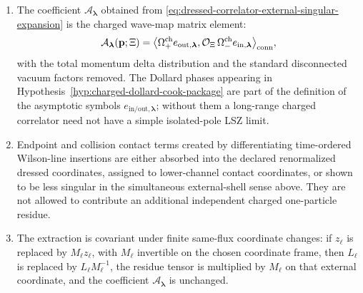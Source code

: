 \begin{hypothesis}
\begin{enumerate}
\begin{equation}
  \widehat G_{\mathbf a}(\mathbf p;\Xi)
  =
  \frac{\ii^{N}
    \sum_{\boldsymbol\lambda}
      \prod_{\ell=1}^{N}
        z_{\ell,a_\ell}{}^{\lambda_\ell}(p_\ell)\,
      \mathcal A_{\boldsymbol\lambda}(\mathbf p;\Xi)}
       {\prod_{\ell=1}^{N}(p_\ell^2+m_\ell^2-\ii0)}
  +
  \widehat G_{\mathbf a}^{\rm less}(\mathbf p;\Xi).
  \label{eq:dressed-correlator-external-singular-expansion}
\end{equation}
Here \(\Xi\) denotes compact gauge-invariant insertions or the remaining
external variables, and ``less'' means that after multiplying by
\(\prod_{\ell}(p_\ell^2+m_\ell^2-\ii0)\) and applying the left inverses, the
term has zero simultaneous shell limit in the wave-packet topology being
used.  Partial shell singularities are assigned to the corresponding
lower-particle disconnected or lower-channel matrix elements before the
connected amplitude is read off.
\item The coefficient
\(\mathcal A_{\boldsymbol\lambda}\) obtained from
\eqref{eq:dressed-correlator-external-singular-expansion} is the charged
wave-map matrix element:
\begin{equation}
  \mathcal A_{\boldsymbol\lambda}(\mathbf p;\Xi)
  =
  \bigl\langle
    \Omega_{+}^{\mathrm{ch}}e_{\mathrm{out},\boldsymbol\lambda},
    \mathcal O_\Xi\,
    \Omega_{-}^{\mathrm{ch}}e_{\mathrm{in},\boldsymbol\lambda}
  \bigr\rangle_{\rm conn},
  \label{eq:dressed-correlator-wave-map-matrix-element}
\end{equation}
with the total momentum delta distribution and the standard disconnected
vacuum factors removed.  The Dollard phases appearing in
Hypothesis~\ref{hyp:charged-dollard-cook-package} are part of the definition
of the asymptotic symbols \(e_{\mathrm{in/out},\boldsymbol\lambda}\); without
them a long-range charged correlator need not have a simple isolated-pole
LSZ limit.
\item Endpoint and collision contact terms created by differentiating
time-ordered Wilson-line insertions are either absorbed into the declared
renormalized dressed coordinates, assigned to lower-channel contact
coordinates, or shown to be less singular in the simultaneous external-shell
sense above.  They are not allowed to contribute an additional independent
charged one-particle residue.
\item The extraction is covariant under finite same-flux coordinate changes:
if \(z_\ell\) is replaced by \(M_\ell z_\ell\), with \(M_\ell\) invertible on
the chosen coordinate frame, then \(L_\ell\) is replaced by
\(L_\ell M_\ell^{-1}\), the residue tensor is multiplied by \(M_\ell\) on
that external coordinate, and the coefficient
\(\mathcal A_{\boldsymbol\lambda}\) is unchanged.
\end{enumerate}
\end{hypothesis}

